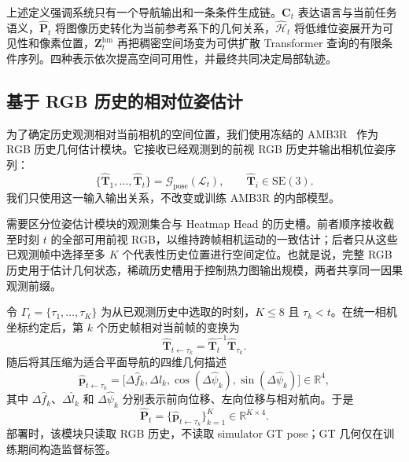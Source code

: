 \documentclass[10pt]{ctexart}
\begin{document}
上述定义强调系统只有一个导航输出和一条条件生成链。$\mathbf{C}_t$ 表达语言与当前任务语义，$\widehat{\mathbf{P}}_t$ 将图像历史转化为当前参考系下的几何关系，$\widehat{\mathcal{H}}_t$ 将低维位姿展开为可见性和像素位置，$\mathbf{Z}^{\mathrm{hm}}_t$ 再把稠密空间场变为可供扩散 Transformer 查询的有限条件序列。四种表示依次提高空间可用性，并最终共同决定局部轨迹。

\subsection{基于 RGB 历史的相对位姿估计}

为了确定历史观测相对当前相机的空间位置，我们使用冻结的 AMB3R~\cite{amb3r} 作为 RGB 历史几何估计模块。它接收已经观测到的前视 RGB 历史并输出相机位姿序列：
\begin{equation}
  \{\widehat{\mathbf{T}}_{1},\ldots,
  \widehat{\mathbf{T}}_{t}\}
  =\mathcal{G}_{\mathrm{pose}}(\mathcal{L}_{t}),
  \qquad \widehat{\mathbf{T}}_i\in\mathrm{SE}(3).
\end{equation}
我们只使用这一输入输出关系，不改变或训练 AMB3R 的内部模型。

需要区分位姿估计模块的观测集合与 Heatmap Head 的历史槽。前者顺序接收截至时刻 $t$ 的全部可用前视 RGB，以维持跨帧相机运动的一致估计；后者只从这些已观测帧中选择至多 $K$ 个代表性历史位置进行空间定位。也就是说，完整 RGB 历史用于估计几何状态，稀疏历史槽用于控制热力图输出规模，两者共享同一因果观测前缀。

令 $\Gamma_t=\{\tau_1,\ldots,\tau_K\}$ 为从已观测历史中选取的时刻，$K\leq 8$ 且 $\tau_k<t$。在统一相机坐标约定后，第 $k$ 个历史帧相对当前帧的变换为
\begin{equation}
  \widehat{\mathbf{T}}_{t\leftarrow\tau_k}
  =\widehat{\mathbf{T}}_{t}^{-1}
   \widehat{\mathbf{T}}_{\tau_k}.
\end{equation}
随后将其压缩为适合平面导航的四维几何描述
\begin{equation}
  \widehat{\mathbf{p}}_{t\leftarrow\tau_k}
  =\bigl[
    \Delta\widehat{f}_k,
    \Delta\widehat{l}_k,
    \cos(\Delta\widehat{\psi}_k),
    \sin(\Delta\widehat{\psi}_k)
  \bigr]\in\mathbb{R}^{4},
\end{equation}
其中 $\Delta\widehat{f}_k$、$\Delta\widehat{l}_k$ 和 $\Delta\widehat{\psi}_k$ 分别表示前向位移、左向位移与相对航向。于是
\begin{equation}
  \widehat{\mathbf{P}}_t
  =\{\widehat{\mathbf{p}}_{t\leftarrow\tau_k}\}_{k=1}^{K}
  \in\mathbb{R}^{K\times4}.
\end{equation}
部署时，该模块只读取 RGB 历史，不读取 simulator GT pose；GT 几何仅在训练期间构造监督标签。
\end{document}

